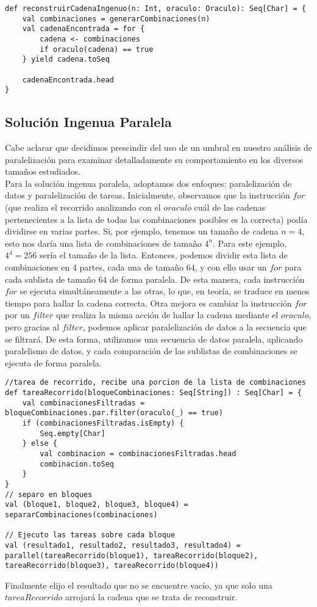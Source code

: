 \documentclass[conference]{IEEEtran}
\begin{document}
\begin{lstlisting}
def reconstruirCadenaIngenuo(n: Int, oraculo: Oraculo): Seq[Char] = {
    val combinaciones = generarCombinaciones(n)
    val cadenaEncontrada = for {
        cadena <- combinaciones
        if oraculo(cadena) == true
    } yield cadena.toSeq
    
    cadenaEncontrada.head
}
\end{lstlisting}

\subsection{\textbf{Solución Ingenua Paralela}}
Cabe aclarar que decidimos prescindir del uso de un umbral en nuestro análisis de paralelización para examinar detalladamente su comportamiento en los diversos tamaños estudiados.\\

Para la solución ingenua paralela, adoptamos dos enfoques: paralelización de datos y paralelización de tareas. Inicialmente, observamos que la instrucción $for$ (que realiza el recorrido analizando con el $oraculo$ cuál de las cadenas pertenecientes a la lista de todas las combinaciones posibles es la correcta) podía dividirse en varias partes. Si, por ejemplo, tenemos un tamaño de cadena $n=4$, esto nos daría una lista de combinaciones de tamaño $4^n$. Para este ejemplo, $4^4 = 256$ sería el tamaño de la lista. Entonces, podemos dividir esta lista de combinaciones en 4 partes, cada una de tamaño $64$, y con ello usar un $for$ para cada sublista de tamaño $64$ de forma paralela. De esta manera, cada instrucción $for$ se ejecuta simultáneamente a las otras, lo que, en teoría, se traduce en menos tiempo para hallar la cadena correcta. Otra mejora es cambiar la instrucción $for$ por un $filter$ que realiza la misma acción de hallar la cadena mediante el $oraculo$, pero gracias al $filter$, podemos aplicar paralelización de datos a la secuencia que se filtrará. De esta forma, utilizamos una secuencia de datos paralela, aplicando paralelismo de datos, y cada comparación de las sublistas de combinaciones se ejecuta de forma paralela.
\begin{lstlisting}
//tarea de recorrido, recibe una porcion de la lista de combinaciones
def tareaRecorrido(bloqueCombinaciones: Seq[String]) : Seq[Char] = {
    val combinacionesFiltradas = bloqueCombinaciones.par.filter(oraculo(_) == true)
    if (combinacionesFiltradas.isEmpty) {
        Seq.empty[Char] 
    } else {
        val combinacion = combinacionesFiltradas.head
        combinacion.toSeq
    }  
}
// separo en bloques
val (bloque1, bloque2, bloque3, bloque4) = separarCombinaciones(combinaciones)

// Ejecuto las tareas sobre cada bloque
val (resultado1, resultado2, resultado3, resultado4) = parallel(tareaRecorrido(bloque1), tareaRecorrido(bloque2), tareaRecorrido(bloque3), tareaRecorrido(bloque4))
\end{lstlisting}
Finalmente elijo el resultado que no se encuentre vacío, ya que solo una $tareaRecorrido$ arrojará la cadena que se trata de reconstruir.
\end{document}
